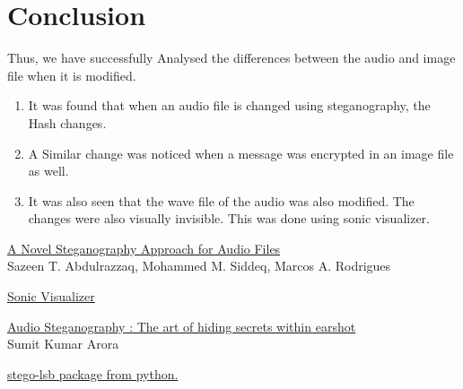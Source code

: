 \documentclass[11pt]{article}
\begin{document}
\section{Conclusion}
Thus, we have successfully Analysed the differences between the audio and image file when it is modified. 
\begin{enumerate}
    \item It was found that when an audio file is changed using steganography, the Hash changes. 
    \item A Similar change was noticed when a message was encrypted in an image file as well. 
    \item It was also seen that the wave file of the audio was also modified. The changes were also visually invisible. This was done using sonic visualizer. 
\end{enumerate}
\clearpage

\pagebreak
\begin{thebibliography}{}
    \href{https://link.springer.com/article/10.1007/s42979-020-0080-2#:~:text=Therefore%2C%20in%20steganography%20the%20original,6%2C7%2C8%5D.}{A Novel Steganography Approach for Audio Files}\\
    Sazeen T. Abdulrazzaq, Mohammed M. Siddeq, Marcos A. Rodrigues

    \href{https://www.sonicvisualiser.org/download.html}{Sonic Visualizer}

    \href{https://sumit-arora.medium.com/audio-steganography-the-art-of-hiding-secrets-within-earshot-part-2-of-2-c76b1be719b3}{Audio Steganography : The art of hiding secrets within earshot} \\Sumit Kumar Arora

    \href{https://github.com/ragibson/Steganography}{stego-lsb package from python. }

    
\end{thebibliography}
\end{document}

